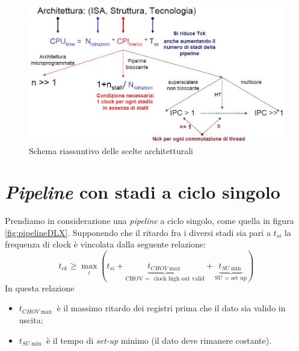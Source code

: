 \begin{figure}[!h]
\centering
\includegraphics[width=\columnwidth]{img/schemaRiassuntivoArchitetture}
\caption{Schema riassuntivo delle scelte architetturali}
\label{fig:schemaRiassuntivoArchitetture}
\end{figure}

\section{\textit{Pipeline} con stadi a ciclo singolo}
\label{sec:pipelineStadiCicloSingolo}

Prendiamo in considerazione una \textit{pipeline} a ciclo singolo, come quella in figura \ref{fig:pipelineDLX}. Supponendo che il ritardo fra i diversi stadi sia pari a $t_{si}$ la frequenza di clock è vincolata dalla seguente relazione:
\[
t_{ck} \geq 
\mathop {\max }\limits_i \left( {t_{si}  + \underbrace {t_{CHOV\max } }_{{\text{CHOV  = }}{\text{ clock high out valid}}} + \underbrace {t_{SU\min } }_{{\text{SU  =  set up}}}} \right)
\]
In questa relazione
\begin{itemize}
\item $t_{CHOV\max}$ è il massimo ritardo dei registri prima che il dato sia valido in uscita;
\item $t_{SU\min}$ è il tempo di \textit{set-up} minimo (il dato deve rimanere costante).
\end{itemize}


